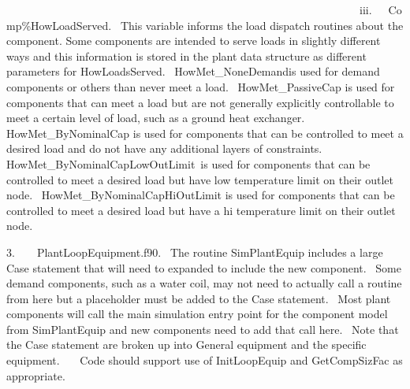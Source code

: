 ~~~~~~~~~~~~~~~~~~~~~~~~~~~~~~~~~~~~~~~~~~~~~~~~~~~~~~~~~~~~~~~~iii.~~~Comp\%HowLoadServed.~ This variable informs the load dispatch routines about the component. Some components are intended to serve loads in slightly different ways and this information is stored in the plant data structure as different parameters for HowLoadsServed.~ HowMet\_NoneDemandis used for demand components or others than never meet a load.~ HowMet\_PassiveCap is used for components that can meet a load but are not generally explicitly controllable to meet a certain level of load, such as a ground heat exchanger.~ HowMet\_ByNominalCap is used for components that can be controlled to meet a desired load and do not have any additional layers of constraints.~ HowMet\_ByNominalCapLowOutLimit~is used for components that can be controlled to meet a desired load but have low temperature limit on their outlet node.~ HowMet\_ByNominalCapHiOutLimit is used for components that can be controlled to meet a desired load but have a hi temperature limit on their outlet node.

3.~~~~PlantLoopEquipment.f90.~ The routine SimPlantEquip includes a large Case statement that will need to expanded to include the new component.~ Some demand components, such as a water coil, may not need to actually call a routine from here but a placeholder must be added to the Case statement.~ Most plant components will call the main simulation entry point for the component model from SimPlantEquip and new components need to add that call here.~ Note that the Case statement are broken up into General equipment and the specific equipment.~~~ Code should support use of InitLoopEquip and GetCompSizFac as appropriate.
